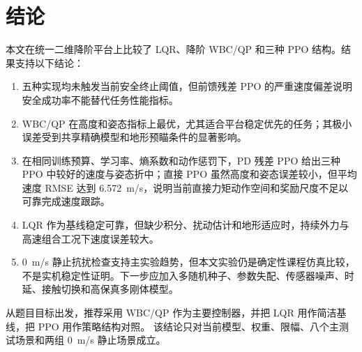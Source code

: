 \documentclass[UTF8,12pt,a4paper,fontset=none]{ctexart}
\begin{document}
\section{结论}
本文在统一二维降阶平台上比较了 LQR、降阶 WBC/QP 和三种 PPO 结构。结果支持以下结论：
\begin{enumerate}
  \item 五种实现均未触发当前安全终止阈值，但前馈残差 PPO 的严重速度偏差说明安全成功率不能替代任务性能指标。
  \item WBC/QP 在高度和姿态指标上最优，尤其适合平台稳定优先的任务；其极小误差受到共享精确模型和地形预瞄条件的显著影响。
  \item 在相同训练预算、学习率、熵系数和动作惩罚下，PD 残差 PPO 给出三种 PPO 中较好的速度与姿态折中；直接 PPO 虽然高度和姿态误差较小，但平均速度 RMSE 达到 \SI{6.572}{m/s}，说明当前直接力矩动作空间和奖励尺度不足以可靠完成速度跟踪。
  \item LQR 作为基线稳定可靠，但缺少积分、扰动估计和地形适应时，持续外力与高速组合工况下速度误差较大。
  \item \SI{0}{m/s} 静止抗扰检查支持主实验趋势，但本文实验仍是确定性课程仿真比较，不是实机稳定性证明。下一步应加入多随机种子、参数失配、传感器噪声、时延、接触切换和高保真多刚体模型。
\end{enumerate}

从题目目标出发，推荐采用 WBC/QP 作为主要控制器，并把 LQR 用作简洁基线，把 PPO 用作策略结构对照。
该结论只对当前模型、权重、限幅、八个主测试场景和两组 \SI{0}{m/s} 静止场景成立。
\end{document}

